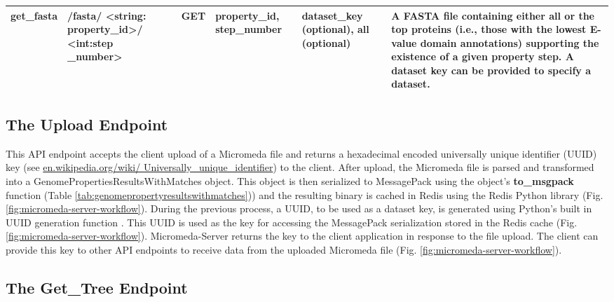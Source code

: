 \begin{longtable}{|p{1.6cm}|p{2.5cm}|p{1.4cm}|p{2.2cm}|p{2.2cm}|p{4cm}|}
get\_fasta & /fasta/ \textless{}string: property\_id\textgreater{}/ \textless{}int:step \_number\textgreater{} & GET & property\_id, step\_number & dataset\_key (optional), all (optional) & A FASTA file containing either all or the top proteins (i.e., those with the lowest E-value domain annotations) supporting the existence of a given property step. A dataset key can be provided to specify a dataset. \\ \hline
\end{longtable}

\subsection{The Upload Endpoint} \label{endpoint-upload}

This API endpoint accepts the client upload of a Micromeda file and returns a hexadecimal encoded universally unique identifier (UUID) key \cite{leach2005universally} (see \href{en.wikipedia.org/wiki/Universally\_unique\_identifier}{en.wikipedia.org/wiki/ Universally\_unique\_identifier}) to the client. After upload, the Micromeda file is parsed and transformed into a GenomePropertiesResultsWithMatches object. This object is then serialized to MessagePack using the object's \textbf{to\_msgpack} function (Table \ref{tab:genomepropertyresultswithmatches})) and the resulting binary is cached in Redis using the Redis Python library \cite{mccurdy_2019} (Fig. \ref{fig:micromeda-server-workflow}). During the previous process, a UUID, to be used as a dataset key, is generated using Python's built in UUID generation function \cite{PythonUUID}. This UUID is used as the key for accessing the MessagePack serialization stored in the Redis cache (Fig. \ref{fig:micromeda-server-workflow}). Micromeda-Server returns the key to the client application in response to the file upload. The client can provide this key to other API endpoints to receive data from the uploaded Micromeda file (Fig. \ref{fig:micromeda-server-workflow}). 

\subsection{The Get\_Tree Endpoint} \label{get-tree}

